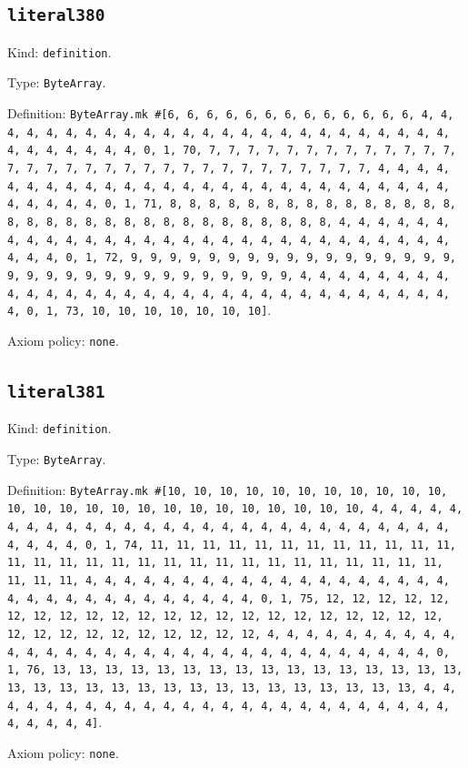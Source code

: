 \documentclass[11pt]{article}
\begin{document}
\subsection*{\texttt{literal380}}
\noindent Kind: \texttt{definition}.\par
\noindent Type: \texttt{ByteArray}.\par
\noindent Definition: \texttt{ByteArray.mk \#[6, 6, 6, 6, 6, 6, 6, 6, 6, 6, 6, 6, 6, 4, 4, 4, 4, 4, 4, 4, 4, 4, 4, 4, 4, 4, 4, 4, 4, 4, 4, 4, 4, 4, 4, 4, 4, 4, 4, 4, 4, 4, 4, 4, 4, 0, 1, 70, 7, 7, 7, 7, 7, 7, 7, 7, 7, 7, 7, 7, 7, 7, 7, 7, 7, 7, 7, 7, 7, 7, 7, 7, 7, 7, 7, 7, 7, 7, 7, 7, 4, 4, 4, 4, 4, 4, 4, 4, 4, 4, 4, 4, 4, 4, 4, 4, 4, 4, 4, 4, 4, 4, 4, 4, 4, 4, 4, 4, 4, 4, 4, 4, 0, 1, 71, 8, 8, 8, 8, 8, 8, 8, 8, 8, 8, 8, 8, 8, 8, 8, 8, 8, 8, 8, 8, 8, 8, 8, 8, 8, 8, 8, 8, 8, 8, 8, 8, 4, 4, 4, 4, 4, 4, 4, 4, 4, 4, 4, 4, 4, 4, 4, 4, 4, 4, 4, 4, 4, 4, 4, 4, 4, 4, 4, 4, 4, 4, 4, 4, 0, 1, 72, 9, 9, 9, 9, 9, 9, 9, 9, 9, 9, 9, 9, 9, 9, 9, 9, 9, 9, 9, 9, 9, 9, 9, 9, 9, 9, 9, 9, 9, 9, 9, 9, 4, 4, 4, 4, 4, 4, 4, 4, 4, 4, 4, 4, 4, 4, 4, 4, 4, 4, 4, 4, 4, 4, 4, 4, 4, 4, 4, 4, 4, 4, 4, 4, 0, 1, 73, 10, 10, 10, 10, 10, 10, 10]}.\par
\noindent Axiom policy: \texttt{none}.\par
\subsection*{\texttt{literal381}}
\noindent Kind: \texttt{definition}.\par
\noindent Type: \texttt{ByteArray}.\par
\noindent Definition: \texttt{ByteArray.mk \#[10, 10, 10, 10, 10, 10, 10, 10, 10, 10, 10, 10, 10, 10, 10, 10, 10, 10, 10, 10, 10, 10, 10, 10, 10, 4, 4, 4, 4, 4, 4, 4, 4, 4, 4, 4, 4, 4, 4, 4, 4, 4, 4, 4, 4, 4, 4, 4, 4, 4, 4, 4, 4, 4, 4, 4, 4, 0, 1, 74, 11, 11, 11, 11, 11, 11, 11, 11, 11, 11, 11, 11, 11, 11, 11, 11, 11, 11, 11, 11, 11, 11, 11, 11, 11, 11, 11, 11, 11, 11, 11, 11, 4, 4, 4, 4, 4, 4, 4, 4, 4, 4, 4, 4, 4, 4, 4, 4, 4, 4, 4, 4, 4, 4, 4, 4, 4, 4, 4, 4, 4, 4, 4, 4, 0, 1, 75, 12, 12, 12, 12, 12, 12, 12, 12, 12, 12, 12, 12, 12, 12, 12, 12, 12, 12, 12, 12, 12, 12, 12, 12, 12, 12, 12, 12, 12, 12, 12, 12, 4, 4, 4, 4, 4, 4, 4, 4, 4, 4, 4, 4, 4, 4, 4, 4, 4, 4, 4, 4, 4, 4, 4, 4, 4, 4, 4, 4, 4, 4, 4, 4, 0, 1, 76, 13, 13, 13, 13, 13, 13, 13, 13, 13, 13, 13, 13, 13, 13, 13, 13, 13, 13, 13, 13, 13, 13, 13, 13, 13, 13, 13, 13, 13, 13, 13, 13, 4, 4, 4, 4, 4, 4, 4, 4, 4, 4, 4, 4, 4, 4, 4, 4, 4, 4, 4, 4, 4, 4, 4, 4, 4, 4, 4, 4, 4, 4]}.\par
\noindent Axiom policy: \texttt{none}.\par
\end{document}
